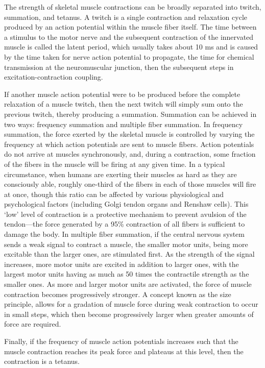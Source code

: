 The strength of skeletal muscle contractions can be broadly separated into twitch, summation, and tetanus. A twitch is a single contraction and relaxation cycle produced by an action potential within the muscle fiber itself. The time between a stimulus to the motor nerve and the subsequent contraction of the innervated muscle is called the latent period, which usually takes about 10 ms and is caused by the time taken for nerve action potential to propagate, the time for chemical transmission at the neuromuscular junction, then the subsequent steps in excitation-contraction coupling.

If another muscle action potential were to be produced before the complete relaxation of a muscle twitch, then the next twitch will simply sum onto the previous twitch, thereby producing a summation. Summation can be achieved in two ways: frequency summation and multiple fiber summation. In frequency summation, the force exerted by the skeletal muscle is controlled by varying the frequency at which action potentials are sent to muscle fibers. Action potentials do not arrive at muscles synchronously, and, during a contraction, some fraction of the fibers in the muscle will be firing at any given time. In a typical circumstance, when humans are exerting their muscles as hard as they are consciously able, roughly one-third of the fibers in each of those muscles will fire at once, though this ratio can be affected by various physiological and psychological factors (including Golgi tendon organs and Renshaw cells). This `low' level of contraction is a protective mechanism to prevent avulsion of the tendon---the force generated by a 95\% contraction of all fibers is sufficient to damage the body. In multiple fiber summation, if the central nervous system sends a weak signal to contract a muscle, the smaller motor units, being more excitable than the larger ones, are stimulated first. As the strength of the signal increases, more motor units are excited in addition to larger ones, with the largest motor units having as much as 50 times the contractile strength as the smaller ones. As more and larger motor units are activated, the force of muscle contraction becomes progressively stronger. A concept known as the size principle, allows for a gradation of muscle force during weak contraction to occur in small steps, which then become progressively larger when greater amounts of force are required.

Finally, if the frequency of muscle action potentials increases such that the muscle contraction reaches its peak force and plateaus at this level, then the contraction is a tetanus.

